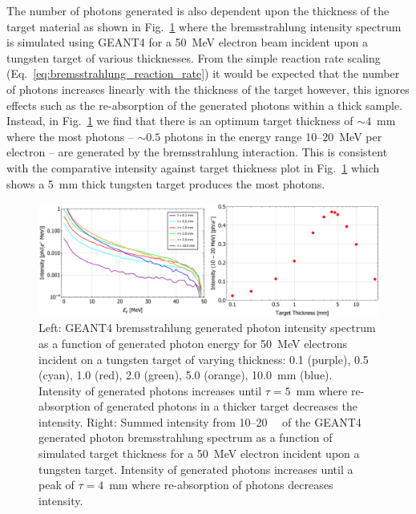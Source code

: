 \documentclass[../main.tex]{subfiles}
\begin{document}
The number of photons generated is also dependent upon the thickness of the target material as shown in Fig.~\ref{fig:bremsstrahlung_target_thickness} where the bremsstrahlung intensity spectrum is simulated using \textsc{GEANT4} \cite{agostinelli2003geant4} for a 50~\si{\mega\electronvolt} electron beam incident upon a tungsten target of various thicknesses. From the simple reaction rate scaling (Eq.~\ref{eq:bremsstrahlung_reaction_rate}) it would be expected that the number of photons increases linearly with the thickness of the target however, this ignores effects such as the re-absorption of the generated photons within a thick sample. Instead, in Fig.~\ref{fig:bremsstrahlung_target_thickness} we find that there is an optimum target thickness of $\sim 4$~\si{\milli\meter} where the most photons -- $\sim 0.5$ photons in the energy range 10--20~\si{\mega\electronvolt} per electron -- are generated by the bremsstrahlung interaction. This is consistent with the comparative intensity against target thickness plot in Fig.~\ref{fig:bremsstrahlung_target_thickness} which shows a 5~\si{\milli\meter} thick tungsten target produces the most photons.  
\begin{figure}[!h]
\centering
\includegraphics[width=\textwidth]{Figures/DIANA_Inverse_Compton_Source_Design/brem_thickness_studies.pdf}
\caption{Left: \textsc{GEANT4} bremsstrahlung generated photon intensity spectrum as a function of generated photon energy for 50~\si{\mega\electronvolt} electrons incident on a tungsten target of varying thickness: 0.1 (purple), 0.5 (cyan), 1.0 (red), 2.0 (green), 5.0 (orange), 10.0~\si{\milli\meter} (blue). Intensity of generated photons increases until $\tau = 5$~\si{\milli\meter} where re-absorption of generated photons in a thicker target decreases the intensity. Right: Summed intensity from 10--20~\si{\mega\electonvolt} of the \textsc{GEANT4} generated photon bremsstrahlung spectrum as a function of simulated target thickness for a 50~\si{\mega\electronvolt} electron incident upon a tungsten target. Intensity of generated photons increases until a peak of $\tau = 4$~\si{\milli\meter} where re-absorption of photons decreases intensity.}
\label{fig:bremsstrahlung_target_thickness}
\end{figure}
\end{document}

